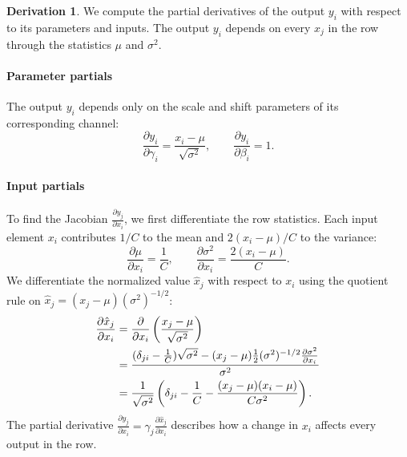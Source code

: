 \documentclass[letterpaper, 10 pt, conference]{ieeeconf}
\newcommand{\pdv}[2]{\frac{\partial #1}{\partial #2}}
\newcommand{\kron}[2]{\delta_{#1 #2}}
\theoremstyle{definition}
\newtheorem*{derivation}{Derivation}
\begin{document}
\begin{derivation}
  We compute the partial derivatives of the output $y_i$ with respect to its parameters and inputs. The output $y_i$ depends on every $x_j$ in the row through the statistics $\mu$ and $\sigma^2$.

  \paragraph{Parameter partials}
  The output $y_i$ depends only on the scale and shift parameters of its corresponding channel:
  \begin{equation}
    \pdv{y_i}{\gamma_i} = \frac{x_i - \mu}{\sqrt{\sigma^2}},
    \qquad
    \pdv{y_i}{\beta_i} = 1.
    \label{eq:ln-dydparam}
  \end{equation}

  \paragraph{Input partials}
  To find the Jacobian $\pdv{y_j}{x_i}$, we first differentiate the row statistics. Each input element $x_i$ contributes $1/C$ to the mean and $2(x_i - \mu)/C$ to the variance:
  \begin{equation}
    \pdv{\mu}{x_i} = \frac{1}{C},
    \qquad
    \pdv{\sigma^2}{x_i} = \frac{2(x_i - \mu)}{C}.
    \label{eq:ln-dstats}
  \end{equation}
  We differentiate the normalized value $\hat{x}_j$ with respect to $x_i$ using the quotient rule on $\hat{x}_j = (x_j - \mu)(\sigma^2)^{-1/2}$:
  \begin{align}
    \pdv{\hat{x}_j}{x_i}
     & = \pdv{}{x_i} \left( \frac{x_j - \mu}{\sqrt{\sigma^2}} \right) \notag                                                             \\
     & = \frac{(\kron{j}{i} - \frac{1}{C})\sqrt{\sigma^2} - (x_j - \mu)\frac{1}{2}(\sigma^2)^{-1/2}\pdv{\sigma^2}{x_i}}{\sigma^2} \notag \\
     & = \frac{1}{\sqrt{\sigma^2}} \left( \kron{j}{i} - \frac{1}{C} - \frac{(x_j - \mu)(x_i - \mu)}{C\sigma^2} \right).
    \label{eq:ln-dxhatdx}
  \end{align}
  The partial derivative $\pdv{y_j}{x_i} = \gamma_j \pdv{\hat{x}_j}{x_i}$ describes how a change in $x_i$ affects every output in the row.
\end{derivation}
\end{document}
